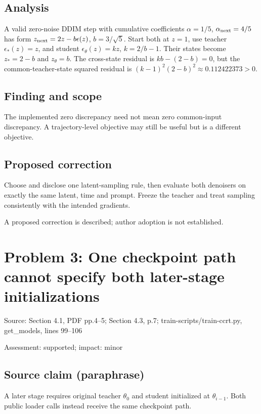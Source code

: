 \documentclass[11pt]{article}
\begin{document}
\subsection*{Analysis}

A valid zero-noise DDIM step with cumulative coefficients \(\alpha=1/5\), \(\alpha_{\rm next}=4/5\) has form \(z_{\rm next}=2z-b\epsilon(z)\), \(b=3/\sqrt5\). Start both at \(z=1\), use teacher \(\epsilon_*(z)=z\), and student \(\epsilon_\theta(z)=kz\), \(k=2/b-1\). Their states become \(z_*=2-b\) and \(z_\theta=b\). The cross-state residual is \(kb-(2-b)=0\), but the common-teacher-state squared residual is \((k-1)^2(2-b)^2\approx0.112422373>0\).

\subsection*{Finding and scope}

The implemented zero discrepancy need not mean zero common-input discrepancy. A trajectory-level objective may still be useful but is a different objective.

\subsection*{Proposed correction}

Choose and disclose one latent-sampling rule, then evaluate both denoisers on exactly the same latent, time and prompt. Freeze the teacher and treat sampling consistently with the intended gradients.

A proposed correction is described; author adoption is not established.

\section*{Problem 3: One checkpoint path cannot specify both later-stage initializations}

Source: Section 4.1, PDF pp.4–5; Section 4.3, p.7; train-scripts/train-ccrt.py, get\_models, lines 99–106

Assessment: supported; impact: minor

\subsection*{Source claim (paraphrase)}

A later stage requires original teacher \(\theta_0\) and student initialized at \(\theta_{i-1}\). Both public loader calls instead receive the same checkpoint path.
\end{document}

